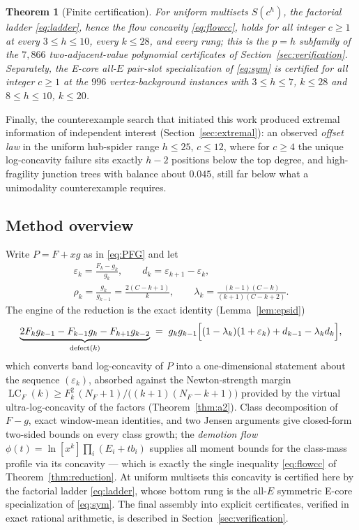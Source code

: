\documentclass[11pt]{article}
\newtheorem{theorem}{Theorem}[section]
\theoremstyle{definition}
\newcommand{\eps}{\varepsilon}
\DeclareMathOperator{\lc}{LC}
\begin{document}
\begin{theorem}[Finite certification]\label{thm:cert}
For uniform multisets $S(c^h)$, the factorial ladder
\eqref{eq:ladder}, hence the flow concavity \eqref{eq:flowcc}, holds
for all integer $c\ge1$ at every $3\le h\le10$, every $k\le28$, and
every rung; this is the $p=h$ subfamily of the $7{,}866$
two-adjacent-value polynomial certificates of
Section~\ref{sec:verification}.  Separately, the E-core all-$E$
pair-slot specialization of \eqref{eq:sym} is certified for all
integer $c\ge1$ at the $996$ vertex-background instances with
$3\le h\le7$, $k\le28$ and $8\le h\le10$, $k\le20$.
\end{theorem}

Finally, the counterexample search that initiated this work produced
extremal information of independent interest
(Section~\ref{sec:extremal}): an observed \emph{offset law} in the
uniform hub-spider range $h\le25$, $c\le12$, where for $c\ge4$ the
unique log-concavity failure sits exactly $h-2$ positions below the
top degree, and high-fragility junction trees with balance about
$0.045$, still far below what a unimodality counterexample requires.

\subsection{Method overview}\label{sec:overview}

Write $P=F+xg$ as in \eqref{eq:PFG} and let
\[
  \begin{gathered}
  \eps_k=\frac{F_k-g_k}{g_k},\qquad d_k=\eps_{k+1}-\eps_k,\\
  \rho_k=\frac{g_k}{g_{k-1}}=\frac{2(C-k+1)}{k},\qquad
  \lambda_k=\frac{(k-1)(C-k)}{(k+1)(C-k+2)} .
  \end{gathered}
\]
The engine of the reduction is the exact identity
(Lemma~\ref{lem:epsid})
\[
  \underbrace{2F_kg_{k-1}-F_{k-1}g_k-F_{k+1}g_{k-2}}_{\text{defect}(k)}
  \;=\; g_kg_{k-1}\Bigl[(1-\lambda_k)(1+\eps_k)+d_{k-1}-\lambda_kd_k\Bigr],
\]
which converts band log-concavity of $P$ into a one-dimensional
statement about the sequence $(\eps_k)$, absorbed against the
Newton-strength margin $\lc_F(k)\ge F_k^2\,(N_F+1)/\bigl((k+1)(N_F-k+1)\bigr)$
provided by the virtual ultra-log-concavity of the factors
(Theorem~\ref{thm:a2}).  Class decomposition of $F-g$, exact
window-mean identities, and two Jensen arguments give closed-form
two-sided bounds on every class growth; the \emph{demotion flow}
$\phi(t)=\ln[x^k]\prod_i(E_i+tb_i)$ supplies all moment bounds for the
class-mass profile via its concavity --- which is exactly the single
inequality \eqref{eq:flowcc} of Theorem~\ref{thm:reduction}.  At
uniform multisets this concavity is certified here by the factorial
ladder \eqref{eq:ladder}, whose bottom rung is the all-$E$ symmetric
E-core specialization of \eqref{eq:sym}.  The final assembly into
explicit certificates, verified in exact rational arithmetic, is described in
Section~\ref{sec:verification}.
\end{document}
